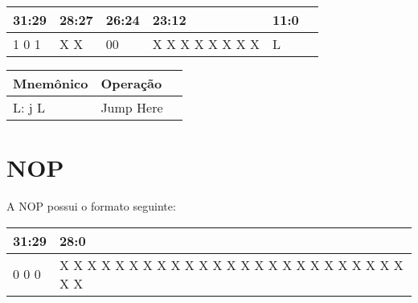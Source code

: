 \documentclass{report}
\begin{document}
    \FloatBarrier
    \begin{table}[H]
      \begin{center}
        \begin{tabular}[pos]{|m{2cm}|m{2cm}|m{1cm}|m{3cm}|m{1cm}|m{5cm}|} 
          \hline
          \cellcolor[gray]{0.9}\textbf{31:29} & 
          \cellcolor[gray]{0.9}\textbf{28:27} &
          \cellcolor[gray]{0.9}\textbf{26:24} &
          \cellcolor[gray]{0.9}\textbf{23:12} &
          \cellcolor[gray]{0.9}\textbf{11:0}  \\ \hline
            1 0 1 & X X & 00 & X X X X X X X X & L \\ \hline
        \end{tabular}
      \end{center}
    \end{table}  

   \FloatBarrier
    \begin{table}[H]
      \begin{center}
        \begin{tabular}[pos]{|m{4cm}|m{4cm}|m{7cm}|} 
          \hline
          \cellcolor[gray]{0.9}\textbf{Mnemônico} &
          \cellcolor[gray]{0.9}\textbf{Operação} \\ \hline
            L: j L & Jump Here \\ \hline
        \end{tabular}
      \end{center}
    \end{table}  
  
\section{NOP}
A NOP possui o formato seguinte:

   \FloatBarrier
    \begin{table}[H]
      \begin{center}
        \begin{tabular}[pos]{|m{2cm}|m{14cm}|} 
          \hline
          \cellcolor[gray]{0.9}\textbf{31:29} & 
          \cellcolor[gray]{0.9}\textbf{28:0} \\ \hline
            0 0 0 & X X X X X X X X X X X X X X X X X X X X X X X X X X X \\ \hline
        \end{tabular}
      \end{center}
    \end{table}  
  
\end{document}
